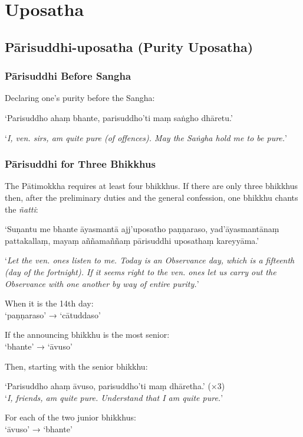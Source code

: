 \chapter{Uposatha}

\section{Pārisuddhi-uposatha (Purity Uposatha)}

\subsection{Pārisuddhi Before Sangha}

Declaring one's purity before the Sangha:

‘Parisuddho ahaṃ bhante, parisuddho'ti maṃ saṅgho dhāretu.’

‘\emph{I, ven. sirs, am quite pure (of offences). May the Saṅgha hold me to be pure.}’


\subsection{Pārisuddhi for Three Bhikkhus}

The Pātimokkha requires at least four bhikkhus. If there are only three bhikkhus then, after the preliminary duties and the general confession, one bhikkhu
chants the \emph{ñatti}:

‘Suṇantu me bhante āyasmantā ajj'uposatho paṇṇaraso, yad'āyasmantānaṃ
pattakallaṃ, mayaṃ aññamaññaṃ pārisuddhi uposathaṃ kareyyāma.’

‘\emph{Let the ven. ones listen to me. Today is an Observance day, which is a
  fifteenth (day of the fortnight). If it seems right to the ven. ones let
  us carry out the Observance with one another by way of entire purity.}’

When it is the 14th day:\\
‘paṇṇaraso’ → ‘cātuddaso’

If the announcing bhikkhu is the most senior:\\
‘bhante’ → ‘āvuso’

Then, starting with the senior bhikkhu:

‘Parisuddho ahaṃ āvuso, parisuddho'ti maṃ dhāretha.’ (×3)\\
‘\emph{I, friends, am quite pure. Understand that I am quite pure.}’

For each of the two junior bhikkhus:\\
‘āvuso’ → ‘bhante’

